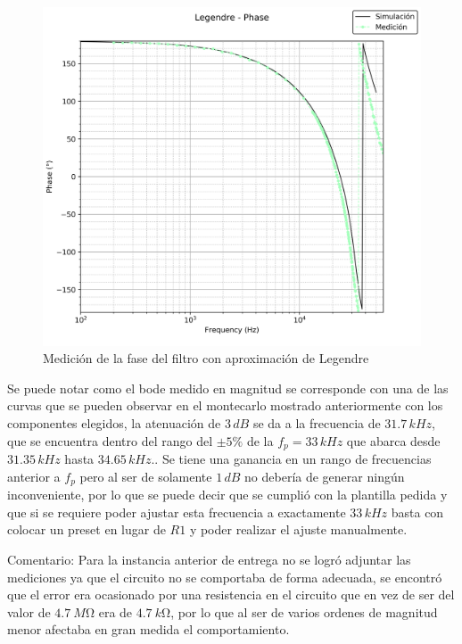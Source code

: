 \begin{figure}[H]
	\centering
	\includegraphics[scale=0.5,keepaspectratio]{../Ex1/Informe/BodeLegendreFase.png}
	\caption{Medición de la fase del filtro con aproximación de Legendre}
	\label{fig:medicionlegendrefase}
\end{figure}

	Se puede notar como el bode medido en magnitud se corresponde con una de las curvas que se pueden observar en el montecarlo mostrado anteriormente con los componentes elegidos, la atenuación de $3 \, dB$ se da a la frecuencia de $31.7 \, kHz$, que se encuentra dentro del rango del $\pm 5 \%$ de la $f_p = 33 \, kHz$ que abarca desde $31.35 \, kHz$ hasta $34.65 \, kHz.$. Se tiene una ganancia en un rango de frecuencias anterior a $f_p$ pero al ser de solamente $1 \, dB$ no debería de generar ningún inconveniente, por lo que se puede decir que se cumplió con la plantilla pedida y que si se requiere poder ajustar esta frecuencia a exactamente $33 \, kHz$ basta con colocar un preset en lugar de $R1$ y poder realizar el ajuste manualmente. 

	Comentario: Para la instancia anterior de entrega no se logró adjuntar las mediciones ya que el circuito no se comportaba de forma adecuada, se encontró que el error era ocasionado por una resistencia en el circuito que en vez de ser del valor de $\SI{4.7}{M\ohm}$ era de $\SI{4.7}{k\ohm}$, por lo que al ser de varios ordenes de magnitud menor afectaba en gran medida el comportamiento.
	
